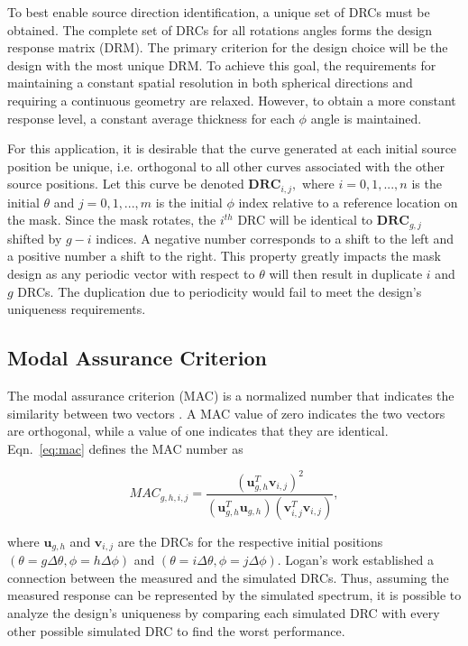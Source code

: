 \documentclass[3p,times]{elsarticle}
\begin{document}
To best enable source direction identification, a unique set of DRCs must be obtained. 
The complete set of DRCs for all rotations angles forms the design response matrix (DRM).
The primary criterion for the design choice will be the design with the most unique DRM.  
To achieve this goal, the requirements for maintaining a constant spatial resolution in both spherical directions and requiring a continuous geometry are relaxed.  
However, to obtain a more constant response level, a constant average thickness for each $\phi$ angle is maintained.  

For this application, it is desirable that the curve generated at each initial source position be unique, i.e. orthogonal to all other curves associated with the other source positions.  
Let this curve be denoted $\mathbf{DRC}_{i,j},$ where $i=0,1,...,n$ is the initial $\theta$ and $j=0,1,...,m$ is the initial $\phi$ index relative to a reference location on the mask.  
Since the mask rotates, the $i^{th}$ DRC will be identical to $\mathbf{DRC}_{g,j}$ shifted by $g-i$ indices.   
A negative number corresponds to a shift to the left and a positive number a shift to the right.  
This property greatly impacts the mask design as any periodic vector with respect to $\theta$ will then result in duplicate $i$ and $g$ DRCs.  
The duplication due to periodicity would fail to meet the design's uniqueness requirements.

\subsection{Modal Assurance Criterion} \label{sec:MAC}
The modal assurance criterion (MAC) is a normalized number that indicates the similarity between two vectors \cite{Allemang03}.
A MAC value of zero indicates the two vectors are orthogonal, while a value of one indicates that they are identical.  
Eqn.~\ref{eq:mac} defines the MAC number as

\begin{equation}
MAC_{g,h,i,j}=\frac{\left(\mathbf{u}_{g,h}^T\mathbf{v}_{i,j}\right)^2}{\left(\mathbf{u}_{g,h}^T\mathbf{u}_{g,h}\right)\left(\mathbf{v}_{i,j}^T\mathbf{v}_{i,j}\right)},
\label{eq:mac}
\end{equation}

\noindent where $\mathbf{u}_{g,h}$ and $\mathbf{v}_{i,j}$ are the DRCs for the respective initial positions $\left(\theta=g\Delta\theta,\phi=h\Delta\phi\right)$ and
$\left(\theta=i\Delta\theta,\phi=j\Delta\phi\right)$.  Logan's work established a connection between the measured and the simulated DRCs.
Thus, assuming the measured response can be represented by the simulated spectrum, it is possible to analyze the design's uniqueness by comparing each simulated DRC with every other possible simulated DRC to find the worst performance.  
\end{document}
